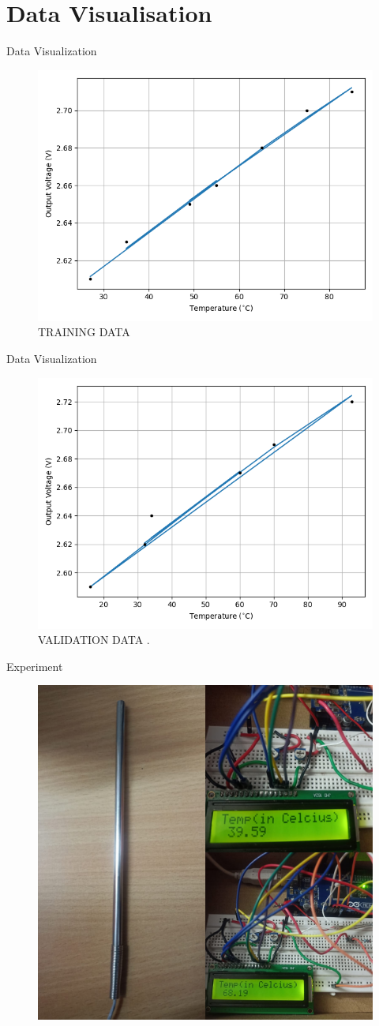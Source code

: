 \documentclass{beamer}
\theoremstyle{remark}
\begin{document}
\section{Data Visualisation}
 \begin{frame}{Data Visualization}
    \begin{figure}[!ht]
        \centering
        \includegraphics[width=0.6\columnwidth]{figs/train.png}
        \caption{TRAINING DATA}
        \label{fig:data}
    \end{figure}
\end{frame}

 \begin{frame}{Data Visualization}
    \begin{figure}[!ht]
        \centering
        \includegraphics[width=0.6\columnwidth]{figs/valid.png}
        \caption{VALIDATION DATA .}
        \label{fig:data}
    \end{figure}
\end{frame}
\begin{frame}{Experiment}
   \begin{figure}[!ht]
        \centering
        \includegraphics[width=0.6\columnwidth]{figs/arduino.png}
    \end{figure}
\end{frame}
\end{document}
